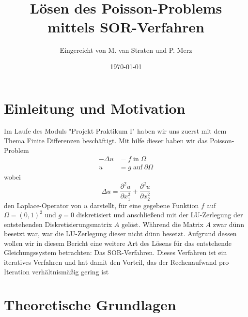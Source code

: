 \documentclass{scrartcl}
\title{Lösen des Poisson-Problems mittels SOR-Verfahren}
\author{%
  Eingereicht von M. van Straten und P. Merz
}
\date{\today}
\theoremstyle{definition}
\begin{document}
\maketitle
\tableofcontents
\cleardoublepage%


\section{Einleitung und Motivation}
Im Laufe des Moduls "Projekt Praktikum I" haben wir uns zuerst mit dem Thema Finite Differenzen
beschäftigt. Mit hilfe dieser haben wir das Poisson-Problem
\begin{align}\label{Eq:Poisson}
    -\Delta u & = f \; \text{in} \; \Omega           \\
    u         & = g \; \text{auf} \; \partial \Omega
\end{align}
wobei
\begin{equation*}
    \Delta u = \frac{\partial^2 u}{\partial x_1^2} + \frac{\partial^2 u}{\partial x_2^2}
\end{equation*}
den Laplace-Operator von \(u\) darstellt, für eine gegebene Funktion \(f\)
auf \(\Omega = {(0, 1)}^2\) und \(g = 0\) diskretisiert und anschließend mit 
der LU-Zerlegung der entstehenden Diskretisierungsmatrix \(A\) gelöst. Während die Matrix \(A\) zwar dünn besetzt war,
war die LU-Zerlegung dieser nicht dünn besetzt. Aufgrund dessen wollen wir in diesem Bericht eine weitere Art des
Lösens für das entstehende Gleichungssystem betrachten: Das SOR-Verfahren. Dieses Verfahren ist ein iteratives Verfahren
und hat damit den Vorteil, das der Rechenaufwand pro Iteration verhältnismäßig gering ist \cite{AB3}




\section{Theoretische Grundlagen}
\end{document}
